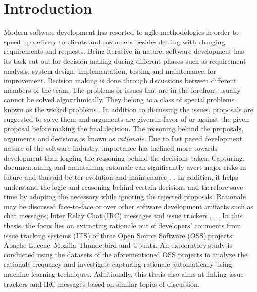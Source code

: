\documentclass[a4paper,12pt,twoside]{report}
\begin{document}

\chapter{Introduction}
Modern software development has resorted to agile methodologies in order to speed up delivery to clients and customers besides dealing with changing requirements and requests. Being iterative in nature, software development has its task cut out for decision making during different phases such as requirement analysis, system design, implementation, testing and maintenance, for improvement. Decision making is done through discussions between different members of the team. The problems or issues that are in the forefront usually cannot be solved algorithmically. They belong to a class of special problems known as the wicked problems \cite{Rittel1973}. In addition to discussing the issues, proposals are suggested to solve them and arguments are given in favor of or against the given proposal before making the final decision. The reasoning behind the proposals, arguments and decisions is known as \textit{rationale}. 
\newline \newline
Due to fast paced development nature of the software industry, importance has inclined more towards development than logging the reasoning behind the decisions taken. Capturing, documentaining and maintaining rationale can significantly avert major risks in future and thus aid better evolution and maintenance \cite{Bruegge2009}, \cite{Dutoit2006}. In addition, it helps understand the logic and reasoning behind certain decisions and therefore save time by adopting the necessary while ignoring the rejected proposals. Rationale may be discussed face-to-face or over other software development artifacts such as chat messages, Inter Relay Chat (IRC) messages and issue trackers \cite{Lata2016}, \cite{Nonnenmacher2017},  \cite{Panichella2014}.  
\newline \newline
In this thesis, the focus lies on extracting rationale out of developers' comments from issue tracking systems (ITS) of three Open Source Software (OSS) projects: Apache Lucene, Mozilla Thunderbird and Ubuntu. An exploratory study is conducted using the datasets of the aforementioned OSS projects to analyze the rationale frequency and investigate capturing rationale automatically using machine learning techniques. Additionally, this thesis also aims at linking issue trackers and IRC messages based on similar topics of discussion. 
\end{document}
